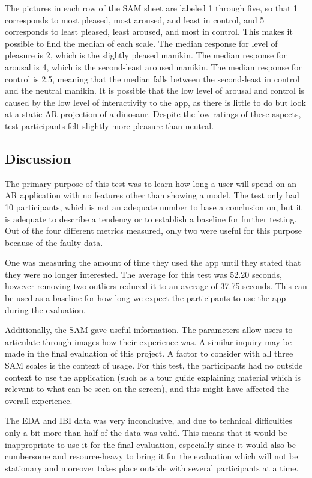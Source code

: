 The pictures in each row of the SAM sheet are labeled 1 through five, so that 1 corresponds to most pleased, most aroused, and least in control, and 5 corresponds to least pleased, least aroused, and most in control. This makes it possible to find the median of each scale. The median response for level of pleasure is 2, which is the slightly pleased manikin. The median response for arousal is 4, which is the second-least aroused manikin. The median response for control is 2.5, meaning that the median falls between the second-least in control and the neutral manikin. It is possible that the low level of arousal and control is caused by the low level of interactivity to the app, as there is little to do but look at a static AR projection of a dinosaur. Despite the low ratings of these aspects, test participants felt slightly more pleasure than neutral. 

\subsection{Discussion}
The primary purpose of this test was to learn how long a user will spend on an AR application with no features other than showing a model. The test only had 10 participants, which is not an adequate number to base a conclusion on, but it is adequate to describe a tendency or to establish a baseline for further testing. Out of the four different metrics measured, only two were useful for this purpose because of the faulty data. 

One was measuring the amount of time they used the app until they stated that they were no longer interested. The average for this test was 52.20 seconds, however removing two outliers reduced it to an average of 37.75 seconds. This can be used as a baseline for how long we expect the participants to use the app during the evaluation.

Additionally, the SAM gave useful information. The parameters allow users to articulate through images how their experience was. A similar inquiry may be made in the final evaluation of this project. A factor to consider with all three SAM scales is the context of usage. For this test, the participants had no outside context to use the application (such as a tour guide explaining material which is relevant to what can be seen on the screen), and this might have affected the overall experience.

The EDA and IBI data was very inconclusive, and due to technical difficulties only a bit more than half of the data was valid. This means that it would be inappropriate to use it for the final evaluation, especially since it would also be cumbersome and resource-heavy to bring it for the evaluation which will not be stationary and moreover takes place outside with several participants at a time.\pagebreak

